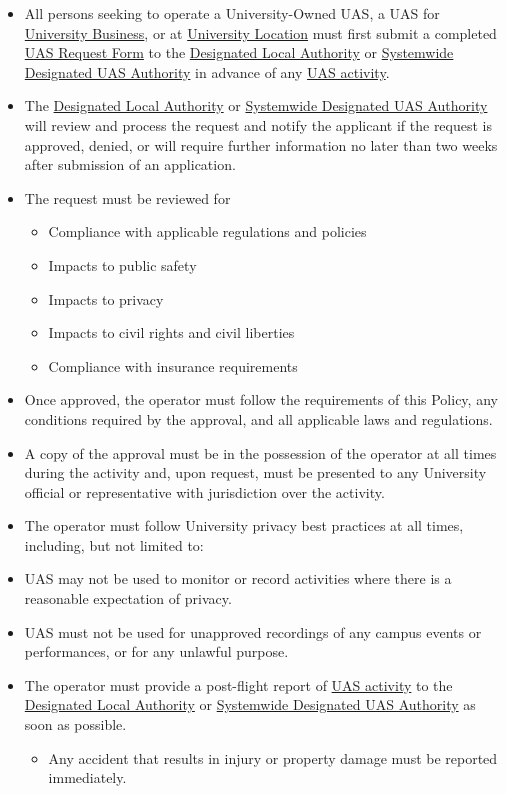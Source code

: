 \documentclass[
]{book}
\providecommand{\tightlist}{%
  \setlength{\itemsep}{0pt}\setlength{\parskip}{0pt}}
\begin{document}
\begin{itemize}
\tightlist
\item
  All persons seeking to operate a University-Owned UAS, a UAS for \protect\hyperlink{UB}{University Business}, or at \protect\hyperlink{UL}{University Location} must first submit a completed \protect\hyperlink{FR}{UAS Request Form} to the \protect\hyperlink{DLA}{Designated Local Authority} or \protect\hyperlink{SDA}{Systemwide Designated UAS Authority} in advance of any \protect\hyperlink{UASactivity}{UAS activity}.
\item
  The \protect\hyperlink{DLA}{Designated Local Authority} or \protect\hyperlink{SDA}{Systemwide Designated UAS Authority} will review and process the request and notify the applicant if the request is approved, denied, or will require further information no later than two weeks after submission of an application.
\item
  The request must be reviewed for

  \begin{itemize}
  \tightlist
  \item
    Compliance with applicable regulations and policies
  \item
    Impacts to public safety
  \item
    Impacts to privacy
  \item
    Impacts to civil rights and civil liberties
  \item
    Compliance with insurance requirements
  \end{itemize}
\item
  Once approved, the operator must follow the requirements of this Policy, any conditions required by the approval, and all applicable laws and regulations.
\item
  A copy of the approval must be in the possession of the operator at all times during the activity and, upon request, must be presented to any University official or representative with jurisdiction over the activity.
\item
  The operator must follow University privacy best practices at all times, including, but not limited to:
\item
  UAS may not be used to monitor or record activities where there is a reasonable expectation of privacy.
\item
  UAS must not be used for unapproved recordings of any campus events or performances, or for any unlawful purpose.
\item
  The operator must provide a post-flight report of \protect\hyperlink{UASactivity}{UAS activity} to the \protect\hyperlink{DLA}{Designated Local Authority} or \protect\hyperlink{SDA}{Systemwide Designated UAS Authority} as soon as possible.

  \begin{itemize}
  \tightlist
  \item
    Any accident that results in injury or property damage must be reported immediately.
  \end{itemize}
\end{itemize}
\end{document}
